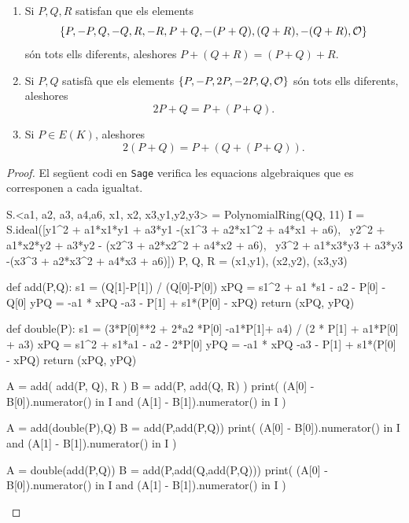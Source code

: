 \begin{proposition}
\begin{enumerate}
    \item Si $P,Q,R$ satisfan que els elements
    \[
    \{P,-P,Q,-Q,R,-R,P+Q,-(P+Q),(Q+R),-(Q+R),\mathcal{O}\}
    \]
    són tots ells diferents, aleshores
    $P+(Q+R)=(P+Q)+R$.
    \item Si $P,Q$ satisfà que els elements $\{P, -P, 2P, -2P, Q, \mathcal{O}\}$ són tots ells diferents, aleshores
    \[
    2P+Q = P+(P+Q).
    \]
    \item Si $P\in E(K)$, aleshores
    \[
    2(P+Q) = P + (Q + (P + Q)).
    \]
\end{enumerate}
\end{proposition}
\begin{proof}
 El següent codi en \texttt{Sage} verifica les equacions algebraiques que es corresponen a cada igualtat.

\begin{python}
S.<a1, a2, a3, a4,a6, x1, x2, x3,y1,y2,y3> = PolynomialRing(QQ, 11)
I = S.ideal([y1^2 + a1*x1*y1 + a3*y1 -(x1^3 + a2*x1^2 + a4*x1 + a6), \
             y2^2 + a1*x2*y2 + a3*y2 - (x2^3 + a2*x2^2 + a4*x2 + a6), \
             y3^2 + a1*x3*y3 + a3*y3 -(x3^3 + a2*x3^2 + a4*x3 + a6)])
P, Q, R = (x1,y1), (x2,y2), (x3,y3)

def add(P,Q):
    s1 = (Q[1]-P[1]) / (Q[0]-P[0])
    xPQ = s1^2 + a1 *s1 - a2 - P[0] - Q[0]
    yPQ = -a1 * xPQ -a3 - P[1] + s1*(P[0] - xPQ)
    return (xPQ, yPQ)

def double(P):
    s1 = (3*P[0]**2 + 2*a2 *P[0] -a1*P[1]+ a4) / (2 * P[1] + a1*P[0] + a3)
    xPQ = s1^2 + s1*a1 - a2 - 2*P[0]
    yPQ = -a1 * xPQ -a3 - P[1] + s1*(P[0] - xPQ)
    return (xPQ, yPQ)

A = add( add(P, Q), R )
B = add(P, add(Q, R) )
print( (A[0] - B[0]).numerator() in I and (A[1] - B[1]).numerator() in I )

A = add(double(P),Q)
B = add(P,add(P,Q))
print( (A[0] - B[0]).numerator() in I and (A[1] - B[1]).numerator() in I )

A = double(add(P,Q))
B = add(P,add(Q,add(P,Q)))
print( (A[0] - B[0]).numerator() in I and (A[1] - B[1]).numerator() in I )
\end{python}
\end{proof}

